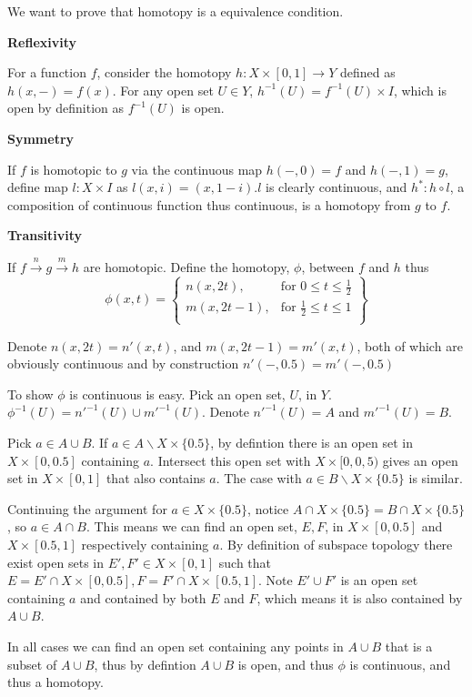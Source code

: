 \documentclass{article}
\theoremstyle{definition}
\theoremstyle{definition}
\theoremstyle{remark}
\begin{document}
We want to prove that homotopy is a equivalence condition.

\textbf{Reflexivity}
 
For a function $f$, consider the homotopy $h: X \times [0,1] \rightarrow Y$ defined as $h(x, -) = f(x)$. For any open set $U \in Y$, $h^{-1}(U) = f^{-1}(U) \times I$, which is open by definition as $f^{-1}(U)$ is open.

\textbf{Symmetry}

If $f$ is homotopic to $g$ via the continuous map $h(-, 0) = f $ and $h(-, 1) =g$, define map $l: X \times I $ as $l(x,i) = (x, 1-i)$.$l$ is clearly continuous, and $h^*: h \circ l$, a composition of continuous function thus continuous, is a homotopy from $g$ to $f$. 

\textbf{Transitivity}

If $f \xrightarrow{n} g \xrightarrow{m} h $ are homotopic.
Define the homotopy, $\phi$, between $f$ and $h$ thus 
  \[
    \phi(x, t) = \left\{\begin{array}{lr}
        n(x, 2t), & \text{for } 0\leq t\leq \frac{1}{2}\\
        m(x, 2t-1), & \text{for } \frac{1}{2}\leq t\leq 1\\
        \end{array}\right\} 
  \]

Denote $n(x, 2t) = n'(x, t)$, and $m(x, 2t-1) = m'(x, t)$, both of which are obviously continuous and by construction $n'(-, 0.5) = m'(-, 0.5)$

To show $\phi$ is continuous is easy. 
Pick an open set, $U$, in $Y$. 
$\phi^{-1}(U) = n'^{-1}(U) \cup m'^{-1}(U)$.
Denote $n'^{-1}(U) = A$ and $m'^{-1}(U) = B$.

Pick $a \in A \cup B$.
If $a \in A \backslash X \times \{0.5\}$, by defintion there is an open set in $X \times [0, 0.5]$ containing $a$. 
Intersect this open set with $X \times [0, 0,5)$ gives an open set in $X\times [0, 1]$ that also contains $a$. 
The case with $a \in B \backslash X \times \{0.5\}$ is similar.

Continuing the argument for $a \in X \times \{0.5\}$, notice $A \cap X \times \{0.5\} = B \cap X \times \{0.5\}$, so $a \in A \cap B$. 
This means we can find an open set, $E, F$, in $X\times [0, 0.5]$ and $X \times [0.5, 1]$ respectively containing $a$. By definition of subspace topology there exist open sets in $E',F' \in X \times [0, 1]$ such that $E = E'\cap X \times [0, 0.5], F = F' \cap X \times [0.5, 1]$. Note $E' \cup F'$ is an open set containing $a$ and contained by both $E$ and $F$, which means it is also contained by $A \cup B$.

In all cases we can find an open set containing any points in $A \cup B$ that is a subset of $A \cup B$, thus by defintion $A \cup B$ is open, and thus $\phi$ is continuous, and thus a homotopy.



\end{document}
